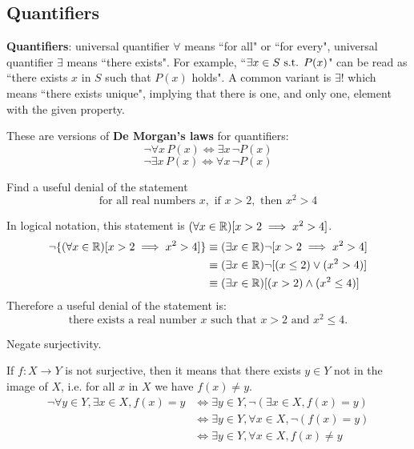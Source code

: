 \subsection{Quantifiers}
\textbf{Quantifiers}: universal quantifier $\forall$ means ``for all" or ``for every", universal quantifier $\exists$ means ``there exists". For example, ``$\exists x \in S \text{ s.t. } P(x)$" can be read as ``there exists $x$ in $S$ such that $P(x)$ holds". A common variant is $\exists!$ which means ``there exists unique", implying that there is one, and only one, element with the given property.

These are versions of \textbf{De Morgan's laws} for quantifiers:
\[ \lnot \forall x\,P(x) \iff \exists x\,\lnot P(x) \]
\[ \lnot \exists x\,P(x) \iff \forall x\,\lnot P(x) \]

\begin{exmp}{}{}
Find a useful denial of the statement
\[ \text{for all real numbers } x, \text{ if } x>2, \text{ then } x^2>4 \]
\end{exmp}
\begin{solution}
In logical notation, this statement is $(\forall x \in \mathbb R)[x>2 \implies x^2>4]$.
\begin{align*}
\lnot\{(\forall x \in \mathbb R)[x>2 \implies x^2>4]\} 
&\equiv (\exists x \in \mathbb R) \lnot[x>2 \implies x^2>4] \\
&\equiv (\exists x \in \mathbb R) \lnot [(x\le2) \lor (x^2>4)] \\
&\equiv (\exists x \in \mathbb R) [(x>2) \land (x^2\le4)]
\end{align*}
Therefore a useful denial of the statement is:
\[ \text{there exists a real number } x \text{ such that } x>2 \text{ and } x^2\le4. \] 
\end{solution}

\begin{exmp}{}{}
Negate surjectivity.
\end{exmp}
\begin{solution}
If $f:X\to Y$ is not surjective, then it means that there exists $y \in Y$ not in the image of $X$, i.e. for all $x$ in $X$ we have $f(x)\neq y$.
\begin{align*}
\lnot \forall y \in Y, \exists x \in X, f(x)=y 
&\iff \exists y \in Y, \lnot (\exists x \in X, f(x)=y) \\
&\iff \exists y \in Y, \forall x \in X, \lnot (f(x)=y) \\
&\iff \exists y \in Y, \forall x \in X, f(x) \neq y
\end{align*}
\end{solution}



